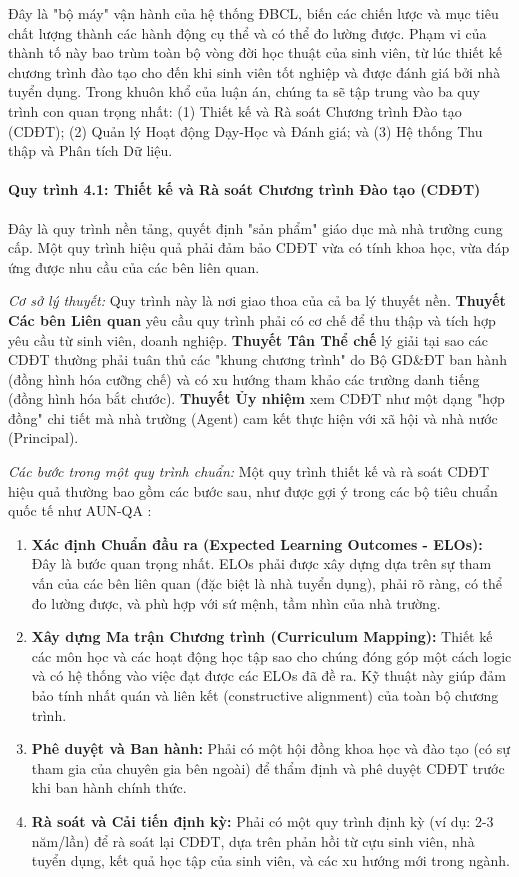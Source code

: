 \documentclass[12pt, a4paper, openany]{report}
\begin{document}
Đây là "bộ máy" vận hành của hệ thống ĐBCL, biến các chiến lược và mục tiêu chất lượng thành các hành động cụ thể và có thể đo lường được. Phạm vi của thành tố này bao trùm toàn bộ vòng đời học thuật của sinh viên, từ lúc thiết kế chương trình đào tạo cho đến khi sinh viên tốt nghiệp và được đánh giá bởi nhà tuyển dụng. Trong khuôn khổ của luận án, chúng ta sẽ tập trung vào ba quy trình con quan trọng nhất: (1) Thiết kế và Rà soát Chương trình Đào tạo (CDĐT); (2) Quản lý Hoạt động Dạy-Học và Đánh giá; và (3) Hệ thống Thu thập và Phân tích Dữ liệu.

\paragraph{Quy trình 4.1: Thiết kế và Rà soát Chương trình Đào tạo (CDĐT)}
Đây là quy trình nền tảng, quyết định "sản phẩm" giáo dục mà nhà trường cung cấp. Một quy trình hiệu quả phải đảm bảo CDĐT vừa có tính khoa học, vừa đáp ứng được nhu cầu của các bên liên quan.

\textit{Cơ sở lý thuyết:} Quy trình này là nơi giao thoa của cả ba lý thuyết nền. \textbf{Thuyết Các bên Liên quan} yêu cầu quy trình phải có cơ chế để thu thập và tích hợp yêu cầu từ sinh viên, doanh nghiệp. \textbf{Thuyết Tân Thể chế} lý giải tại sao các CDĐT thường phải tuân thủ các "khung chương trình" do Bộ GD\&ĐT ban hành (đồng hình hóa cưỡng chế) và có xu hướng tham khảo các trường danh tiếng (đồng hình hóa bắt chước). \textbf{Thuyết Ủy nhiệm} xem CDĐT như một dạng "hợp đồng" chi tiết mà nhà trường (Agent) cam kết thực hiện với xã hội và nhà nước (Principal).

\textit{Các bước trong một quy trình chuẩn:} Một quy trình thiết kế và rà soát CDĐT hiệu quả thường bao gồm các bước sau, như được gợi ý trong các bộ tiêu chuẩn quốc tế như AUN-QA \cite{AUN-QAGuide}:
\begin{enumerate}
    \item \textbf{Xác định Chuẩn đầu ra (Expected Learning Outcomes - ELOs):} Đây là bước quan trọng nhất. ELOs phải được xây dựng dựa trên sự tham vấn của các bên liên quan (đặc biệt là nhà tuyển dụng), phải rõ ràng, có thể đo lường được, và phù hợp với sứ mệnh, tầm nhìn của nhà trường.
    \item \textbf{Xây dựng Ma trận Chương trình (Curriculum Mapping):} Thiết kế các môn học và các hoạt động học tập sao cho chúng đóng góp một cách logic và có hệ thống vào việc đạt được các ELOs đã đề ra. Kỹ thuật này giúp đảm bảo tính nhất quán và liên kết (constructive alignment) của toàn bộ chương trình.
    \item \textbf{Phê duyệt và Ban hành:} Phải có một hội đồng khoa học và đào tạo (có sự tham gia của chuyên gia bên ngoài) để thẩm định và phê duyệt CDĐT trước khi ban hành chính thức.
    \item \textbf{Rà soát và Cải tiến định kỳ:} Phải có một quy trình định kỳ (ví dụ: 2-3 năm/lần) để rà soát lại CDĐT, dựa trên phản hồi từ cựu sinh viên, nhà tuyển dụng, kết quả học tập của sinh viên, và các xu hướng mới trong ngành.
\end{enumerate}
\end{document}
